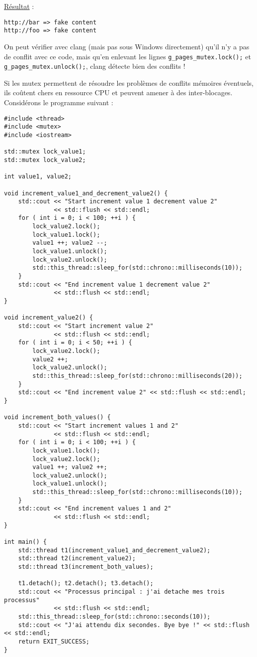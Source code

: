 \documentclass[fleqn,11pt]{article}
\begin{document}
\underline{Résultat} :

\begin{verbatim}
http://bar => fake content
http://foo => fake content
\end{verbatim}

On peut vérifier avec clang (mais pas sous Windows directement) qu'il n'y a pas de conflit avec ce code,
mais qu'en enlevant les lignes \texttt{g\_pages\_mutex.lock();} et \texttt{g\_pages\_mutex.unlock();},
clang détecte bien des conflits !

Si les mutex permettent de résoudre les problèmes de conflits mémoires éventuels, ils coûtent chers
en ressource CPU et peuvent amener à des inter-blocages. Considérons le programme suivant :

\begin{lstlisting}
#include <thread>
#include <mutex>
#include <iostream>

std::mutex lock_value1;
std::mutex lock_value2;

int value1, value2;

void increment_value1_and_decrement_value2() {
    std::cout << "Start increment value 1 decrement value 2" 
              << std::flush << std::endl;
    for ( int i = 0; i < 100; ++i ) {
        lock_value2.lock();
        lock_value1.lock();
        value1 ++; value2 --;
        lock_value1.unlock();
        lock_value2.unlock();
        std::this_thread::sleep_for(std::chrono::milliseconds(10));
    }
    std::cout << "End increment value 1 decrement value 2" 
              << std::flush << std::endl;
}

void increment_value2() {
    std::cout << "Start increment value 2" 
              << std::flush << std::endl;
    for ( int i = 0; i < 50; ++i ) {
        lock_value2.lock();
        value2 ++;
        lock_value2.unlock();
        std::this_thread::sleep_for(std::chrono::milliseconds(20));
    }
    std::cout << "End increment value 2" << std::flush << std::endl;
}

void increment_both_values() {
    std::cout << "Start increment values 1 and 2" 
              << std::flush << std::endl;
    for ( int i = 0; i < 100; ++i ) {
        lock_value1.lock();
        lock_value2.lock();
        value1 ++; value2 ++;
        lock_value2.unlock();
        lock_value1.unlock();
        std::this_thread::sleep_for(std::chrono::milliseconds(10));
    }
    std::cout << "End increment values 1 and 2" 
              << std::flush << std::endl;
}

int main() {
    std::thread t1(increment_value1_and_decrement_value2);
    std::thread t2(increment_value2);
    std::thread t3(increment_both_values);

    t1.detach(); t2.detach(); t3.detach();
    std::cout << "Processus principal : j'ai detache mes trois processus"
              << std::flush << std::endl;
    std::this_thread::sleep_for(std::chrono::seconds(10));
    std::cout << "J'ai attendu dix secondes. Bye bye !" << std::flush << std::endl;
    return EXIT_SUCCESS;
}
\end{lstlisting}
\end{document}
